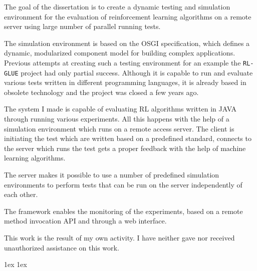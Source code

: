 \documentclass[final]{ubb_dolgozat}
\author{%
Gáll Norbert
}
\begin{document}
\begin{abstractEN} %



 \color{gray!60!red}
	The goal of the dissertation is to create a dynamic testing and simulation environment for the evaluation of reinforcement learning algorithms on a remote server using large number of parallel running tests.
	
	The simulation environment is based on the OSGI specification, which defines a dynamic, modularized component model for building complex applications. 
Previous attempts at creating such a testing environment for an example the \texttt{RL-GLUE} project had only partial success. Although it is capable to run and evaluate various tests written in different programming languages, it is already based in obsolete technology and the project was closed a few years ago. 

	The system I made is capable of evaluating RL algorithms written in JAVA through running various experiments. All this happens with the help of a simulation environment which runs on a remote access server. The client is initiating the test which are written based on a  predefined standard, connects to the server which runs the test gets a proper feedback with the help of machine learning algorithms. 

	The server makes it possible to use a number of predefined simulation environments to perform tests that  can be run on the server independently of each other.
	 
	The framework enables the monitoring of the experiments, based on a remote method invocation API and through a web interface. 

	This work is the result of my own activity. I have neither gave nor received unauthorized assistance on this work.


\end{abstractEN}

\maketitle


{ \baselineskip 1ex
  \parskip 1ex
  \tableofcontents
}
\end{document}
